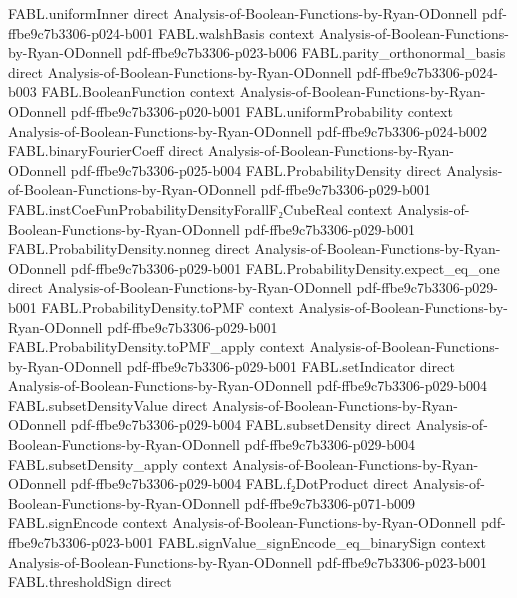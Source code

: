 \begin{theorem}
\proofstep
  {FABL.uniformInner}
  {direct}
  {Analysis-of-Boolean-Functions-by-Ryan-ODonnell}
  {pdf-ffbe9c7b3306-p024-b001}
\proofstep
  {FABL.walshBasis}
  {context}
  {Analysis-of-Boolean-Functions-by-Ryan-ODonnell}
  {pdf-ffbe9c7b3306-p023-b006}
\proofstep
  {FABL.parity_orthonormal_basis}
  {direct}
  {Analysis-of-Boolean-Functions-by-Ryan-ODonnell}
  {pdf-ffbe9c7b3306-p024-b003}
\proofstep
  {FABL.BooleanFunction}
  {context}
  {Analysis-of-Boolean-Functions-by-Ryan-ODonnell}
  {pdf-ffbe9c7b3306-p020-b001}
\proofstep
  {FABL.uniformProbability}
  {context}
  {Analysis-of-Boolean-Functions-by-Ryan-ODonnell}
  {pdf-ffbe9c7b3306-p024-b002}
\proofstep
  {FABL.binaryFourierCoeff}
  {direct}
  {Analysis-of-Boolean-Functions-by-Ryan-ODonnell}
  {pdf-ffbe9c7b3306-p025-b004}
\proofstep
  {FABL.ProbabilityDensity}
  {direct}
  {Analysis-of-Boolean-Functions-by-Ryan-ODonnell}
  {pdf-ffbe9c7b3306-p029-b001}
\proofstep
  {FABL.instCoeFunProbabilityDensityForallF₂CubeReal}
  {context}
  {Analysis-of-Boolean-Functions-by-Ryan-ODonnell}
  {pdf-ffbe9c7b3306-p029-b001}
\proofstep
  {FABL.ProbabilityDensity.nonneg}
  {direct}
  {Analysis-of-Boolean-Functions-by-Ryan-ODonnell}
  {pdf-ffbe9c7b3306-p029-b001}
\proofstep
  {FABL.ProbabilityDensity.expect_eq_one}
  {direct}
  {Analysis-of-Boolean-Functions-by-Ryan-ODonnell}
  {pdf-ffbe9c7b3306-p029-b001}
\proofstep
  {FABL.ProbabilityDensity.toPMF}
  {context}
  {Analysis-of-Boolean-Functions-by-Ryan-ODonnell}
  {pdf-ffbe9c7b3306-p029-b001}
\proofstep
  {FABL.ProbabilityDensity.toPMF_apply}
  {context}
  {Analysis-of-Boolean-Functions-by-Ryan-ODonnell}
  {pdf-ffbe9c7b3306-p029-b001}
\proofstep
  {FABL.setIndicator}
  {direct}
  {Analysis-of-Boolean-Functions-by-Ryan-ODonnell}
  {pdf-ffbe9c7b3306-p029-b004}
\proofstep
  {FABL.subsetDensityValue}
  {direct}
  {Analysis-of-Boolean-Functions-by-Ryan-ODonnell}
  {pdf-ffbe9c7b3306-p029-b004}
\proofstep
  {FABL.subsetDensity}
  {direct}
  {Analysis-of-Boolean-Functions-by-Ryan-ODonnell}
  {pdf-ffbe9c7b3306-p029-b004}
\proofstep
  {FABL.subsetDensity_apply}
  {context}
  {Analysis-of-Boolean-Functions-by-Ryan-ODonnell}
  {pdf-ffbe9c7b3306-p029-b004}
\proofstep
  {FABL.f₂DotProduct}
  {direct}
  {Analysis-of-Boolean-Functions-by-Ryan-ODonnell}
  {pdf-ffbe9c7b3306-p071-b009}
\proofstep
  {FABL.signEncode}
  {context}
  {Analysis-of-Boolean-Functions-by-Ryan-ODonnell}
  {pdf-ffbe9c7b3306-p023-b001}
\proofstep
  {FABL.signValue_signEncode_eq_binarySign}
  {context}
  {Analysis-of-Boolean-Functions-by-Ryan-ODonnell}
  {pdf-ffbe9c7b3306-p023-b001}
\proofstep
  {FABL.thresholdSign}
  {direct}

\end{theorem}
